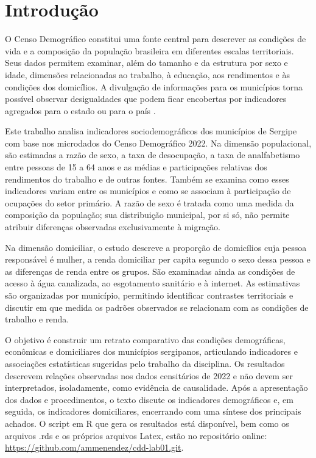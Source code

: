 \documentclass[a4paper,12pt]{article}
\begin{document}
\renewcommand{\listfigurename}{\centering LISTA DE FIGURAS}
\listoffigures
\thispagestyle{empty}
\clearpage

\renewcommand{\listtablename}{\centering LISTA DE TABELAS}
\listoftables
\thispagestyle{empty}
\clearpage



\section{Introdução}

O Censo Demográfico constitui uma fonte central para descrever as condições de vida e a composição da população brasileira em diferentes escalas territoriais. Seus dados permitem examinar, além do tamanho e da estrutura por sexo e idade, dimensões relacionadas ao trabalho, à educação, aos rendimentos e às condições dos domicílios. A divulgação de informações para os municípios torna possível observar desigualdades que podem ficar encobertas por indicadores agregados para o estado ou para o país \cite{ibge2022censo}.

Este trabalho analisa indicadores sociodemográficos dos municípios de Sergipe com base nos microdados do Censo Demográfico 2022. Na dimensão populacional, são estimadas a razão de sexo, a taxa de desocupação, a taxa de analfabetismo entre pessoas de 15 a 64 anos e as médias e participações relativas dos rendimentos do trabalho e de outras fontes. Também se examina como esses indicadores variam entre os municípios e como se associam à participação de ocupações do setor primário. A razão de sexo é tratada como uma medida da composição da população; sua distribuição municipal, por si só, não permite atribuir diferenças observadas exclusivamente à migração.

Na dimensão domiciliar, o estudo descreve a proporção de domicílios cuja pessoa responsável é mulher, a renda domiciliar per capita segundo o sexo dessa pessoa e as diferenças de renda entre os grupos. São examinadas ainda as condições de acesso à água canalizada, ao esgotamento sanitário e à internet. As estimativas são organizadas por município, permitindo identificar contrastes territoriais e discutir em que medida os padrões observados se relacionam com as condições de trabalho e renda.

O objetivo é construir um retrato comparativo das condições demográficas, econômicas e domiciliares dos municípios sergipanos, articulando indicadores e associações estatísticas sugeridas pelo trabalho da disciplina. Os resultados descrevem relações observadas nos dados censitários de 2022 e não devem ser interpretados, isoladamente, como evidência de causalidade. Após a apresentação dos dados e procedimentos, o texto discute os indicadores demográficos e, em seguida, os indicadores domiciliares, encerrando com uma síntese dos principais achados. O script em R que gera os resultados está disponível, bem como os arquivos .rds e os próprios arquivos Latex, estão no repositório online: \url{https://github.com/ammenendez/cdd-lab01.git}.
\end{document}

